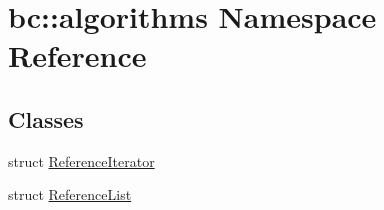 \hypertarget{namespacebc_1_1algorithms}{}\section{bc\+:\+:algorithms Namespace Reference}
\label{namespacebc_1_1algorithms}
\subsection*{Classes}
\begin{DoxyCompactItemize}
\item 
struct \hyperlink{structbc_1_1algorithms_1_1ReferenceIterator}{Reference\+Iterator}
\item 
struct \hyperlink{structbc_1_1algorithms_1_1ReferenceList}{Reference\+List}
\end{DoxyCompactItemize}
